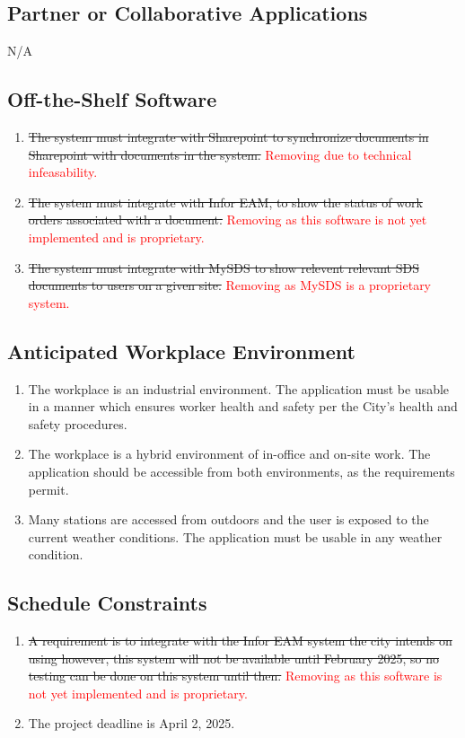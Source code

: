 \documentclass[12pt]{article}
\begin{document}
\subsection{Partner or Collaborative Applications}
N/A
\subsection{Off-the-Shelf Software}
\begin{enumerate} [{C-OTS}1.]
  \item \sout{ The system must integrate with Sharepoint to
      synchronize documents in
    Sharepoint with documents in the system.}
    \textcolor{red}{Removing due to technical infeasability.}
  \item \sout{ The system must integrate with Infor EAM, to show the
      status of work
    orders associated with a document.} \textcolor{red}{Removing as
    this software is not yet implemented and is proprietary.}
  \item \sout{The system must integrate with MySDS to show relevent relevant SDS
    documents to users on a given site.} \textcolor{red}{Removing as
    MySDS is a proprietary system.}
\end{enumerate}

\subsection{Anticipated Workplace Environment}
\begin{enumerate} [{C-AWE}1.]
  \item The workplace is an industrial environment. The application must
    be usable in a manner which ensures worker health and safety per the
    City's health and safety procedures.
  \item The workplace is a hybrid environment of in-office and on-site
    work. The application should be accessible from both environments, as
    the requirements permit.
  \item Many stations are accessed from outdoors and the user is exposed to
    the current weather conditions. The application must be usable in any
    weather condition.
\end{enumerate}

\subsection{Schedule Constraints}
\begin{enumerate} [{C-SCH}1.]
  \item \sout{A requirement is to integrate with the Infor EAM system
      the city intends
      on using however, this system will not be available until
    February 2025, so no testing can be done on this system until then.}
    \textcolor{red}{Removing as this software is not yet implemented
    and is proprietary.}

  \item The project deadline is April 2, 2025.
\end{enumerate}
\end{document}
